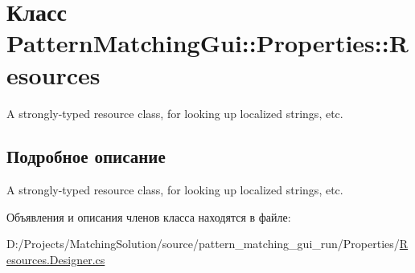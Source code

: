 \hypertarget{class_pattern_matching_gui_1_1_properties_1_1_resources}{
\section{Класс PatternMatchingGui::Properties::Resources}
\label{class_pattern_matching_gui_1_1_properties_1_1_resources}
}
A strongly-typed resource class, for looking up localized strings, etc.  




\subsection{Подробное описание}
A strongly-typed resource class, for looking up localized strings, etc. 



Объявления и описания членов класса находятся в файле:\begin{CompactItemize}
\item 
D:/Projects/MatchingSolution/source/pattern\_\-matching\_\-gui\_\-run/Properties/\hyperlink{_resources_8_designer_8cs}{Resources.Designer.cs}\end{CompactItemize}
